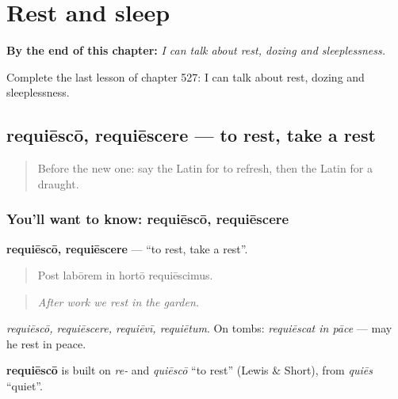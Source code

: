 
\chapter{Rest and sleep}
\label{ch:la-rest-and-sleep}

\begin{chapteropening}
\textbf{By the end of this chapter:} \emph{I can talk about rest, dozing and sleeplessness.}

Complete the last lesson of chapter 527: I can talk about rest, dozing and sleeplessness.
\end{chapteropening}

\section[requiēscō, requiēscere]{requiēscō, requiēscere — to rest, take a rest}

\label{lesson:LA-C527-requiesco}



\begin{quote}
Before the new one: say the Latin for to refresh, then the Latin for a draught.
\end{quote}

\subsection*{You'll want to know: requiēscō, requiēscere}
\textbf{requiēscō, requiēscere} — \textquotedblleft{}to rest, take a rest\textquotedblright{}.

\begin{quote}
Post labōrem in hortō requiēscimus.
\end{quote}

\begin{quote}
\emph{After work we rest in the garden.}
\end{quote}

\emph{requiēscō, requiēscere, requiēvī, requiētum}. On tombs: \emph{requiēscat in pāce} — may he rest in peace.

\begin{cousinweb}
\textbf{requiēscō} is built on \emph{re-} and \emph{quiēscō} \textquotedblleft{}to rest\textquotedblright{} (Lewis \& Short), from \emph{quiēs} \textquotedblleft{}quiet\textquotedblright{}.
\end{cousinweb}

